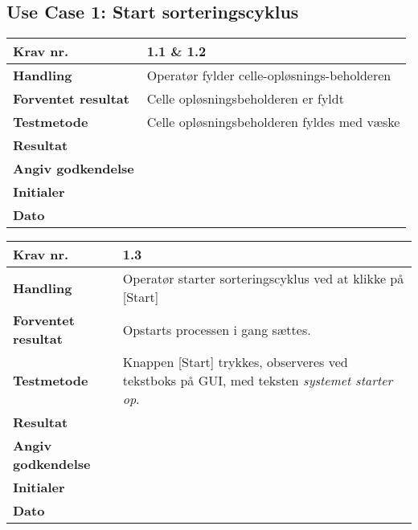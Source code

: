 \subsection{Use Case 1: Start sorteringscyklus}

	\begin{center}
		\begin{longtable}{ | m{4cm}| m{8.5cm}|} 
			\hline
			\textbf{Krav nr.} & 1.1 \& 1.2    \\ 
			\hline
			\textbf{Handling} &  Operatør fylder celle-opløsnings-beholderen   \\
			\hline
			\textbf{Forventet resultat} &  Celle opløsningsbeholderen er fyldt  \\
			\hline
			\textbf{Testmetode}  &  Celle opløsningsbeholderen fyldes med væske  \\
			\hline
			\textbf{Resultat}  &    \\
			\hline
			\textbf{Angiv godkendelse} &     \\
			\hline
			\textbf{Initialer} &     \\
			\hline
			\textbf{Dato} &    \\
			\hline
		\end{longtable}
	\end{center}
	
	
	\begin{center}
		\begin{longtable}{ | m{4cm}| m{8.5cm}|} 
			\hline
			\textbf{Krav nr.} & 1.3    \\ 
			\hline
			\textbf{Handling} &  Operatør starter sorteringscyklus ved at klikke på [Start]  \\
			\hline
			\textbf{Forventet resultat} &  Opstarts processen i gang sættes.  \\
			\hline
			\textbf{Testmetode}  & Knappen [Start] trykkes, observeres ved tekstboks på GUI, med teksten \textit{systemet starter op}.   \\
			\hline
			\textbf{Resultat}  &    \\
			\hline
			\textbf{Angiv godkendelse} &     \\
			\hline
			\textbf{Initialer} &     \\
			\hline
			\textbf{Dato} &    \\
			\hline
		\end{longtable}
	\end{center}
	
